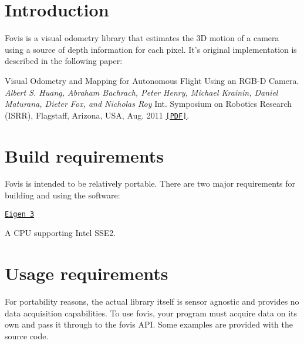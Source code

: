 \hypertarget{index_introduction}{}\section{Introduction}\label{index_introduction}
Fovis is a visual odometry library that estimates the 3D motion of a camera using a source of depth information for each pixel. It's original implementation is described in the following paper:

\begin{DoxyItemize}
\item Visual Odometry and Mapping for Autonomous Flight Using an RGB-\/D Camera. {\itshape Albert S. Huang, Abraham Bachrach, Peter Henry, Michael Krainin, Daniel Maturana, Dieter Fox, and Nicholas Roy\/} Int. Symposium on Robotics Research (ISRR), Flagstaff, Arizona, USA, Aug. 2011 \href{http://people.csail.mit.edu/albert/pubs/2011-huang-isrr.pdf}{\tt \mbox{[}PDF\mbox{]}}.\end{DoxyItemize}
\hypertarget{index_build_requirements}{}\section{Build requirements}\label{index_build_requirements}
Fovis is intended to be relatively portable. There are two major requirements for building and using the software: \begin{DoxyItemize}
\item \href{http://eigen.tuxfamily.org}{\tt Eigen 3} \item A CPU supporting Intel SSE2.\end{DoxyItemize}
\hypertarget{index_usage_requirements}{}\section{Usage requirements}\label{index_usage_requirements}
For portability reasons, the actual library itself is sensor agnostic and provides no data acquisition capabilities. To use fovis, your program must acquire data on its own and pass it through to the fovis API. Some examples are provided with the source code.

